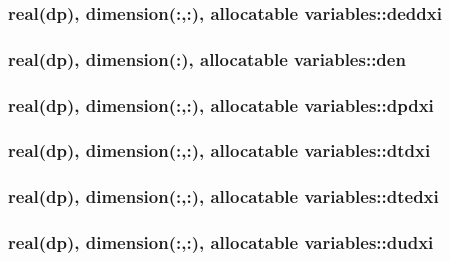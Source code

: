 \hypertarget{classvariables_ae24355786c27f5a676febe36335e0718}{
\subsubsection[{deddxi}]{\setlength{\rightskip}{0pt plus 5cm}real(dp), dimension(\-:,\-:), allocatable variables\-::deddxi}}\label{classvariables_ae24355786c27f5a676febe36335e0718}
\hypertarget{classvariables_aebe58d45baf0e70b27271513dfdb2829}{
\subsubsection[{den}]{\setlength{\rightskip}{0pt plus 5cm}real(dp), dimension(\-:), allocatable variables\-::den}}\label{classvariables_aebe58d45baf0e70b27271513dfdb2829}
\hypertarget{classvariables_af1f54c1cc3dfd9f13d85a48b5e283814}{
\subsubsection[{dpdxi}]{\setlength{\rightskip}{0pt plus 5cm}real(dp), dimension(\-:,\-:), allocatable variables\-::dpdxi}}\label{classvariables_af1f54c1cc3dfd9f13d85a48b5e283814}
\hypertarget{classvariables_ae5589138d3a0b0d28a2bb0ad9fb3e26e}{
\subsubsection[{dtdxi}]{\setlength{\rightskip}{0pt plus 5cm}real(dp), dimension(\-:,\-:), allocatable variables\-::dtdxi}}\label{classvariables_ae5589138d3a0b0d28a2bb0ad9fb3e26e}
\hypertarget{classvariables_abe283c990e397f1ab1bd22b2c34c4458}{
\subsubsection[{dtedxi}]{\setlength{\rightskip}{0pt plus 5cm}real(dp), dimension(\-:,\-:), allocatable variables\-::dtedxi}}\label{classvariables_abe283c990e397f1ab1bd22b2c34c4458}
\hypertarget{classvariables_adf961b8b4d768b0af149ab314d3fa105}{
\subsubsection[{dudxi}]{\setlength{\rightskip}{0pt plus 5cm}real(dp), dimension(\-:,\-:), allocatable variables\-::dudxi}}\label{classvariables_adf961b8b4d768b0af149ab314d3fa105}
